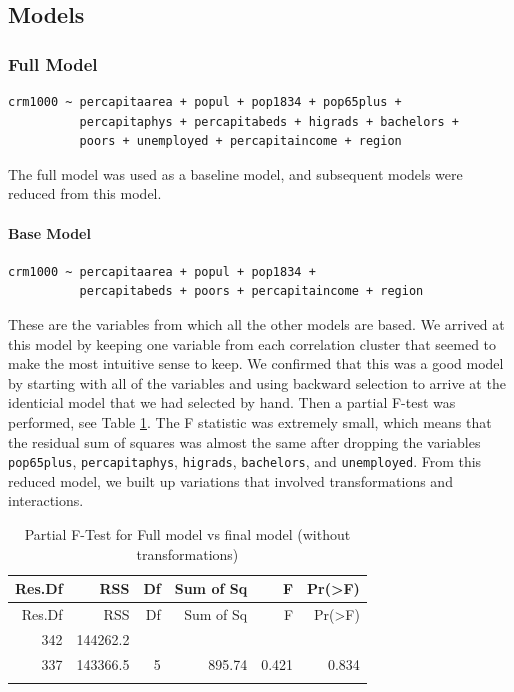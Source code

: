 \documentclass[]{article}
\let\oldparagraph\paragraph
\renewcommand{\paragraph}[1]{\oldparagraph{#1}\mbox{}}
\begin{document}
\subsection{Models}\label{models}

\subsubsection{Full Model}\label{full-model}

\begin{verbatim}
crm1000 ~ percapitaarea + popul + pop1834 + pop65plus +
          percapitaphys + percapitabeds + higrads + bachelors +
          poors + unemployed + percapitaincome + region
\end{verbatim}

The full model was used as a baseline model, and subsequent models were
reduced from this model.

\paragraph{Base Model}\label{base-model}

\begin{verbatim}
crm1000 ~ percapitaarea + popul + pop1834 +
          percapitabeds + poors + percapitaincome + region
\end{verbatim}

These are the variables from which all the other models are based. We
arrived at this model by keeping one variable from each correlation
cluster that seemed to make the most intuitive sense to keep. We
confirmed that this was a good model by starting with all of the
variables and using backward selection to arrive at the identicial model
that we had selected by hand. Then a partial F-test was performed, see
Table \ref{table:ftest_final}. The F statistic was extremely small, which means that the
residual sum of squares was almost the same after dropping the variables
\texttt{pop65plus}, \texttt{percapitaphys}, \texttt{higrads},
\texttt{bachelors}, and \texttt{unemployed}. From this reduced model, we
built up variations that involved transformations and interactions.

\begin{longtable}[]{@{}rrrrrr@{}}
\caption{Partial F-Test for Full model vs final model (without
transformations)}\tabularnewline
\toprule
Res.Df & RSS & Df & Sum of Sq & F & Pr(\textgreater{}F)\tabularnewline
\midrule
\endfirsthead
\toprule
Res.Df & RSS & Df & Sum of Sq & F & Pr(\textgreater{}F)\tabularnewline
\midrule
\endhead
342 & 144262.2 &  & &  &\tabularnewline
337 & 143366.5 & 5 & 895.74 & 0.421 & 0.834\tabularnewline
\bottomrule
\label{table:ftest_final}
\end{longtable}
\end{document}
